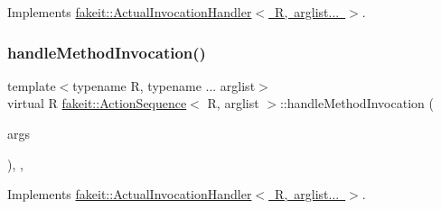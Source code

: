 Implements \mbox{\hyperlink{structfakeit_1_1ActualInvocationHandler_ad44424f6b71c6d5587e80057771d1717}{fakeit\+::\+Actual\+Invocation\+Handler$<$ R, arglist... $>$}}.

\mbox{\label{structfakeit_1_1ActionSequence_a7bc46308e2c35fe407f30045d4ce05a0}} 
\subsubsection{\texorpdfstring{handleMethodInvocation()}{handleMethodInvocation()}\hspace{0.1cm}{\footnotesize\ttfamily [6/9]}}
{\footnotesize\ttfamily template$<$typename R, typename ... arglist$>$ \\
virtual R \mbox{\hyperlink{structfakeit_1_1ActionSequence}{fakeit\+::\+Action\+Sequence}}$<$ R, arglist $>$\+::handle\+Method\+Invocation (\begin{DoxyParamCaption}\item[{\mbox{\hyperlink{namespacefakeit_a476a37a598825e1b5dd67b3a176491a1}{Arguments\+Tuple}}$<$ arglist... $>$ \&}]{args }\end{DoxyParamCaption})\hspace{0.3cm}{\ttfamily [inline]}, {\ttfamily [override]}, {\ttfamily [virtual]}}



Implements \mbox{\hyperlink{structfakeit_1_1ActualInvocationHandler_ad44424f6b71c6d5587e80057771d1717}{fakeit\+::\+Actual\+Invocation\+Handler$<$ R, arglist... $>$}}.

\mbox{\label{structfakeit_1_1ActionSequence_a7bc46308e2c35fe407f30045d4ce05a0}} 
